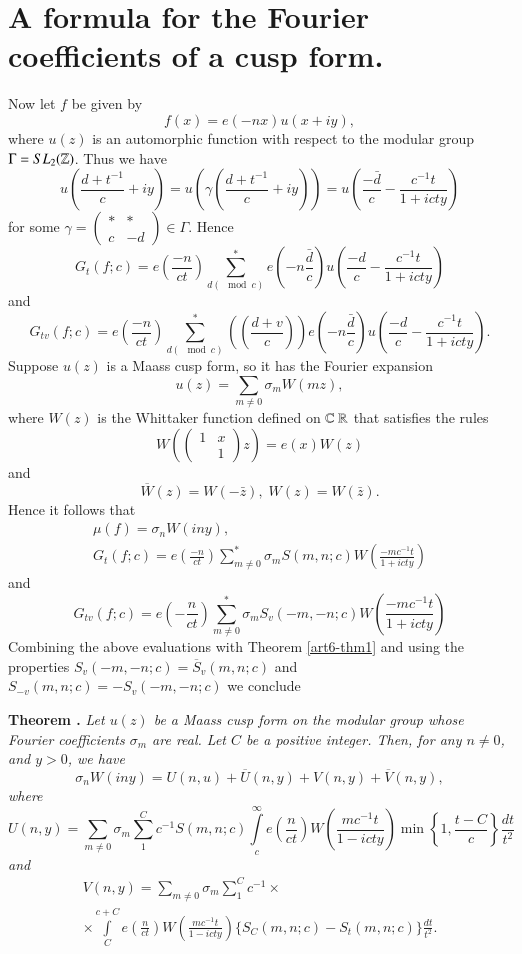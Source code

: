 \section{A formula for the Fourier coefficients of a cusp form.}\label{art6-sec3}
Now let $f$ be given by 
$$
f(x) =e(-nx) u (x+ iy),
$$
where $u(z)$ is an automorphic function with respect to the modular group $\Gamma=SL_2 (\mathbb{Z})$. Thus we have 
$$
u \left(\frac{d+t^{-1}}{c} + iy \right) = u \left(\gamma \left(\frac{d+t^{-1}}{c} + iy \right)  \right) = u \left(\frac{-\bar{d}}{c} - \frac{c^{-1}t}{1+ icty} \right)
$$
for some $\gamma = \begin{pmatrix}
\ast & \ast \\
c & -d
\end{pmatrix} \in \Gamma$. Hence
$$
G_t (f;c) = e \left( \frac{-n}{ct}\right) \sum\limits^\ast_{d (\mod c)} e \left(-n \frac{\bar{d}}{c} \right) u \left(\frac{-d}{c} - \frac{c^{-1}t}{1+ icty} \right)
$$
and 
$$
G_{tv} (f;c) = e \left(\frac{-n}{ct} \right) \sum\limits^\ast_{d(\mod c)} \left(\left( \frac{d+v}{c}\right) \right) e \left(-n\frac{\bar{d}}{c} \right) u \left(\frac{-d}{c} - \frac{c^{-1}t}{1+icty} \right).
$$\pageoriginale 
Suppose $u(z)$ is a Maass cusp form, so it has the Fourier expansion
$$
u(z) = \sum\limits_{m\neq 0} \sigma_m W (mz),
$$ 
where $W(z)$ is the Whittaker function defined on $\bbC \ \bbR$ that satisfies the rules 
$$
W \left(\left(\begin{matrix}
1 & x\\
& 1
\end{matrix} 
 \right) z\right) = e(x) W (z)
$$
and 
$$
\overline{W} (z) = W (-\bar{z}), \; W (z) = W (\bar{z}).
$$
Hence it follows that 
\begin{gather*}
\mu (f) = \sigma_n W (iny),\\
G_t(f;c ) =e \left(\frac{-n}{ct} \right) \sum\limits^\ast_{m\neq 0} \sigma_m S (m,n;c) W \left(\frac{-mc^{-1}t}{1+icty} \right)
\end{gather*}
and 
$$
G_{tv} (f;c) = e \left( -\frac{n}{ct}\right) \sum\limits^\ast_{m \neq 0} \sigma_m S_v (-m , -n ; c) W \left( \frac{-mc^{-1} t}{1+ icty}\right)
$$
Combining the above evaluations with Theorem \ref{art6-thm1} and using the properties $S_v (-m, -n;c) = \overline{S}_v (m,n;c)$ and $S_{-v} (m, n;c) = - S_v (-m, -n; c)$ we conclude 

\medskip
\noindent
{\bfseries Theorem .\label{art6-thm3}}
\textit{Let $u(z)$ be a Maass cusp form on the modular group whose Fourier coefficients $\sigma_m$ are real. Let $C$ be a positive integer. Then, for any $n\neq 0$, and $y>0$, we have}
$$
\sigma_n W (iny) = U (n,u) + \overline{U} (n,y) + V (n,y) + \overline{V} (n,y),
$$
\textit{where}
$$
U(n,y) = \sum\limits_{m\neq 0} \sigma_m \sum\limits^C_1 c^{-1} S (m, n;c) \int\limits^\infty_c e \left(\frac{n}{ct} \right) W \left(\frac{mc^{-1}t}{1-icty} \right) \min
\left\{1, \frac{t-C}{c} \right\} \frac{dt}{t^2}
$$
\textit{and}
\begin{multline*}
V (n,y) = \sum\limits_{m \neq 0} \sigma_m  \sum\limits^C_1 c^{-1} \times \\
\times \int\limits^{c+ C}_C e \left(\frac{n}{ct} \right) W \left(\frac{mc^{-1}t}{1-icty} \right) \{S_C (m,n;c) - S_t (m,n;c)\} \frac{dt}{t^2}.
\end{multline*}

